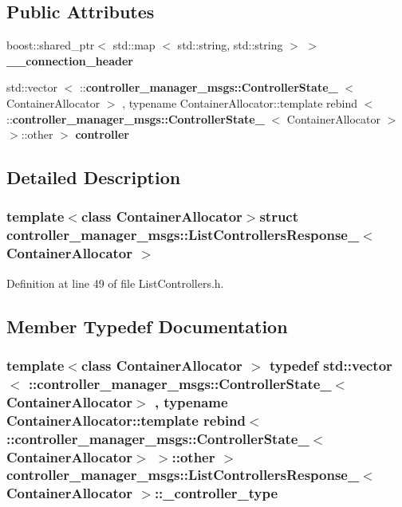 \subsection*{\-Public \-Attributes}
\begin{DoxyCompactItemize}
\item 
boost\-::shared\-\_\-ptr$<$ std\-::map\*
$<$ std\-::string, std\-::string $>$ $>$ {\bf \-\_\-\-\_\-connection\-\_\-header}
\item 
std\-::vector\*
$<$ \-::{\bf controller\-\_\-manager\-\_\-msgs\-::\-Controller\-State\-\_\-}\*
$<$ \-Container\-Allocator $>$\*
, typename \*
\-Container\-Allocator\-::template \*
rebind\*
$<$ \-::{\bf controller\-\_\-manager\-\_\-msgs\-::\-Controller\-State\-\_\-}\*
$<$ \-Container\-Allocator $>$\*
 $>$\-::other $>$ {\bf controller}
\end{DoxyCompactItemize}


\subsection{\-Detailed \-Description}
\subsubsection*{template$<$class Container\-Allocator$>$struct controller\-\_\-manager\-\_\-msgs\-::\-List\-Controllers\-Response\-\_\-$<$ Container\-Allocator $>$}



\-Definition at line 49 of file \-List\-Controllers.\-h.



\subsection{\-Member \-Typedef \-Documentation}
\subsubsection[{\-\_\-controller\-\_\-type}]{\setlength{\rightskip}{0pt plus 5cm}template$<$class Container\-Allocator $>$ typedef std\-::vector$<$ \-::{\bf controller\-\_\-manager\-\_\-msgs\-::\-Controller\-State\-\_\-}$<$\-Container\-Allocator$>$ , typename \-Container\-Allocator\-::template rebind$<$ \-::{\bf controller\-\_\-manager\-\_\-msgs\-::\-Controller\-State\-\_\-}$<$\-Container\-Allocator$>$ $>$\-::other $>$ {\bf controller\-\_\-manager\-\_\-msgs\-::\-List\-Controllers\-Response\-\_\-}$<$ \-Container\-Allocator $>$\-::{\bf \-\_\-controller\-\_\-type}}\label{structcontroller__manager__msgs_1_1ListControllersResponse___aca36705e33641739651a8de0c59853a1}


